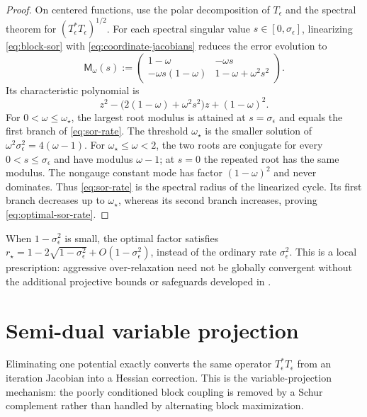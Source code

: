 \documentclass[11pt]{article}
\theoremstyle{definition}
\theoremstyle{remark}
\newcommand{\eps}{\epsilon}
\begin{document}
\begin{proof}
On centered functions, use the polar decomposition of $T_\eps$ and the
spectral theorem for $(T_\eps^\ast T_\eps)^{1/2}$. For each spectral
singular value $s\in[0,\sigma_\eps]$, linearizing
\eqref{eq:block-sor} with \eqref{eq:coordinate-jacobians} reduces the
error evolution to
\begin{equation}
  \label{eq:sor-mode-matrix}
  \mathsf M_\omega(s)
  :=
  \begin{pmatrix}
    1-\omega & -\omega s\\
    -\omega s(1-\omega) & 1-\omega+\omega^2s^2
  \end{pmatrix}.
\end{equation}
Its characteristic polynomial is
\[
  z^2-\bigl(2(1-\omega)+\omega^2s^2\bigr)z
  +(1-\omega)^2.
\]
For $0<\omega\leq\omega_\star$, the largest root modulus is attained at
$s=\sigma_\eps$ and equals the first branch of
\eqref{eq:sor-rate}. The threshold $\omega_\star$ is the smaller
solution of
$\omega^2\sigma_\eps^2=4(\omega-1)$. For
$\omega_\star\leq\omega<2$, the two roots are conjugate for every
$0<s\leq\sigma_\eps$ and have modulus $\omega-1$; at $s=0$ the
repeated root has the same modulus. The nongauge constant mode has factor
$(1-\omega)^2$ and never dominates. Thus \eqref{eq:sor-rate} is the
spectral radius of the linearized cycle. Its first branch decreases up
to $\omega_\star$, whereas its second branch increases, proving
\eqref{eq:optimal-sor-rate}.
\end{proof}

When $1-\sigma_\eps^2$ is small, the optimal factor satisfies
$r_\star=1-2\sqrt{1-\sigma_\eps^2}
+O(1-\sigma_\eps^2)$, instead of the ordinary rate
$\sigma_\eps^2$. This is a local prescription: aggressive
over-relaxation need not be globally convergent without the additional
projective bounds or safeguards developed in
\cite{ThibaultEtAl2021,LehmannEtAl2022}.

\section{Semi-dual variable projection}
\label{sec:semidual}

Eliminating one potential exactly converts the same operator
$T_\eps^\ast T_\eps$ from an iteration Jacobian into a Hessian correction. This
is the variable-projection mechanism: the poorly conditioned block
coupling is removed by a Schur complement rather than handled by
alternating block maximization.
\end{document}
